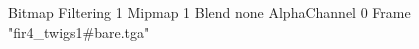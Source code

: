{Bitmap
	{Filtering 1}
	{Mipmap 1}
	{Blend none}
	{AlphaChannel 0}
	{Frame "fir4_twigs1#bare.tga"}
}
